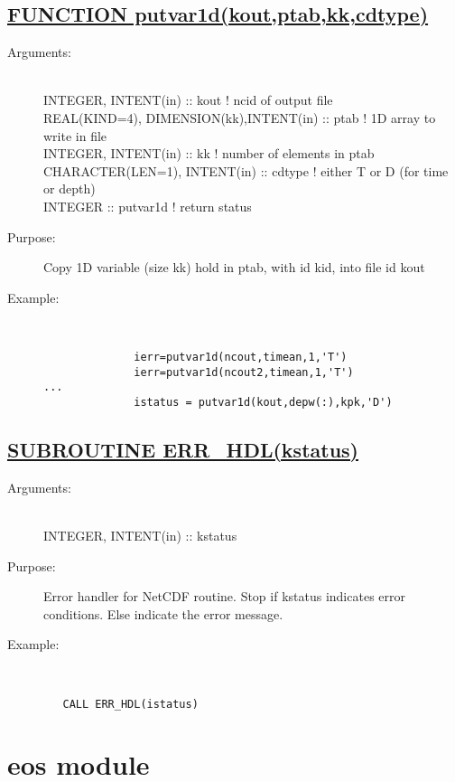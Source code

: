 \documentclass[a4paper,11pt]{article}
\begin{document}
\subsection*{\underline{FUNCTION putvar1d(kout,ptab,kk,cdtype)  }}
\begin{description}
\item[Arguments:] \ \\
       INTEGER, INTENT(in) :: kout             ! ncid of output file \\
       REAL(KIND=4), DIMENSION(kk),INTENT(in) :: ptab ! 1D array to write in file \\
       INTEGER, INTENT(in) :: kk               ! number of elements in ptab \\
       CHARACTER(LEN=1), INTENT(in)  :: cdtype ! either T or D (for time or depth) \\
       INTEGER :: putvar1d                     ! return status
\item[Purpose:]  Copy 1D variable (size kk) hold in ptab,  with id kid, into file id kout
\item[Example:]\ \\
\begin{verbatim}
              ierr=putvar1d(ncout,timean,1,'T') 
              ierr=putvar1d(ncout2,timean,1,'T')
...
              istatus = putvar1d(kout,depw(:),kpk,'D')
\end{verbatim}
\end{description}
\newpage

\subsection*{\underline{SUBROUTINE ERR\_HDL(kstatus) }}
\begin{description}
\item[Arguments:] \ \\
INTEGER, INTENT(in) ::  kstatus
\item[Purpose:] Error handler for NetCDF routine.  Stop if kstatus indicates error conditions.
Else indicate the error message.
\item[Example:]\ \\
\begin{verbatim}
   CALL ERR_HDL(istatus)
\end{verbatim}
\end{description}
\newpage

\section{ eos module}
\end{document}
